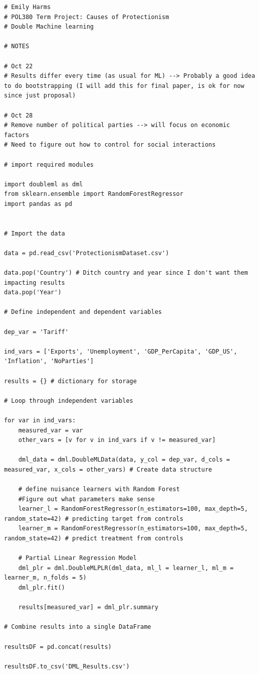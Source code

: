 \documentclass[11pt]{article}
\begin{document}
\begin{lstlisting}
# Emily Harms
# POL380 Term Project: Causes of Protectionism
# Double Machine learning

# NOTES

# Oct 22
# Results differ every time (as usual for ML) --> Probably a good idea to do bootstrapping (I will add this for final paper, is ok for now since just proposal)

# Oct 28
# Remove number of political parties --> will focus on economic factors
# Need to figure out how to control for social interactions 

# import required modules

import doubleml as dml
from sklearn.ensemble import RandomForestRegressor
import pandas as pd


# Import the data

data = pd.read_csv('ProtectionismDataset.csv')

data.pop('Country') # Ditch country and year since I don't want them impacting results 
data.pop('Year') 

# Define independent and dependent variables 

dep_var = 'Tariff'

ind_vars = ['Exports', 'Unemployment', 'GDP_PerCapita', 'GDP_US', 'Inflation', 'NoParties']

results = {} # dictionary for storage

# Loop through independent variables

for var in ind_vars:
    measured_var = var
    other_vars = [v for v in ind_vars if v != measured_var]

    dml_data = dml.DoubleMLData(data, y_col = dep_var, d_cols = measured_var, x_cols = other_vars) # Create data structure

    # define nuisance learners with Random Forest
    #Figure out what parameters make sense 
    learner_l = RandomForestRegressor(n_estimators=100, max_depth=5, random_state=42) # predicting target from controls
    learner_m = RandomForestRegressor(n_estimators=100, max_depth=5, random_state=42) # predict treatment from controls 

    # Partial Linear Regression Model 
    dml_plr = dml.DoubleMLPLR(dml_data, ml_l = learner_l, ml_m = learner_m, n_folds = 5) 
    dml_plr.fit()

    results[measured_var] = dml_plr.summary

# Combine results into a single DataFrame

resultsDF = pd.concat(results)

resultsDF.to_csv('DML_Results.csv')
\end{lstlisting}
\end{document}

